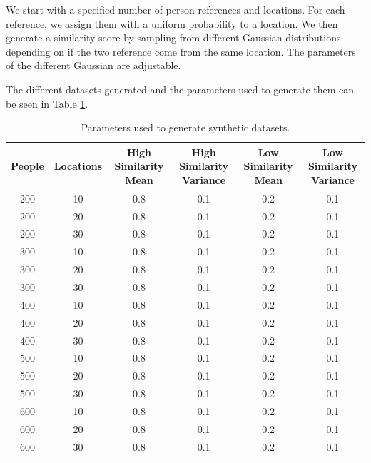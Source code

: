 \documentclass{article}
\begin{document}
            We start with a specified number of person references and locations.
            For each reference, we assign them with a uniform probability to a location.
            We then generate a similarity score by sampling from different Gaussian distributions depending on if the two reference come from the same location.
            The parameters of the different Gaussian are adjustable.
            
            The different datasets generated and the parameters used to generate them can be seen in Table \ref{tab:generated-datasets}.
            
            \begin{table}
                \footnotesize
                
                \begin{center}
                    \begin{tabular}{| c | c | c | c | c | c |}
                        \hline
                            People & Locations & High Similarity Mean & High Similarity Variance  & Low Similarity Mean & Low Similarity Variance \\
                        \hline
                            200 & 10 & 0.8 & 0.1 & 0.2 & 0.1 \\
                            200 & 20 & 0.8 & 0.1 & 0.2 & 0.1 \\
                            200 & 30 & 0.8 & 0.1 & 0.2 & 0.1 \\
                            300 & 10 & 0.8 & 0.1 & 0.2 & 0.1 \\
                            300 & 20 & 0.8 & 0.1 & 0.2 & 0.1 \\
                            300 & 30 & 0.8 & 0.1 & 0.2 & 0.1 \\
                            400 & 10 & 0.8 & 0.1 & 0.2 & 0.1 \\
                            400 & 20 & 0.8 & 0.1 & 0.2 & 0.1 \\
                            400 & 30 & 0.8 & 0.1 & 0.2 & 0.1 \\
                            500 & 10 & 0.8 & 0.1 & 0.2 & 0.1 \\
                            500 & 20 & 0.8 & 0.1 & 0.2 & 0.1 \\
                            500 & 30 & 0.8 & 0.1 & 0.2 & 0.1 \\
                            600 & 10 & 0.8 & 0.1 & 0.2 & 0.1 \\
                            600 & 20 & 0.8 & 0.1 & 0.2 & 0.1 \\
                            600 & 30 & 0.8 & 0.1 & 0.2 & 0.1 \\
                        \hline
                    \end{tabular}
                    \caption{Parameters used to generate synthetic datasets.}
                \label{tab:generated-datasets}
                \end{center}
            \end{table}
    
\end{document}
